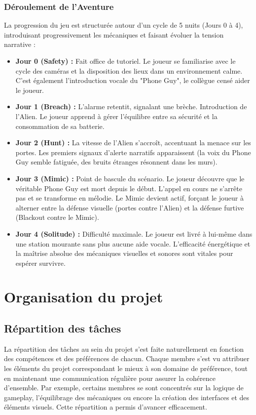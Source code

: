 \documentclass[11pt, a4paper]{article}
\begin{document}
    \subsubsection{Déroulement de l'Aventure}
    
    La progression du jeu est structurée autour d'un cycle de 5 nuits (Jours 0 à 4), introduisant progressivement les mécaniques et faisant évoluer la tension narrative :
    \begin{itemize}
        \item \textbf{Jour 0 (Safety) :} Fait office de tutoriel. Le joueur se familiarise avec le cycle des caméras et la disposition des lieux dans un environnement calme. C'est également l'introduction vocale du "Phone Guy", le collègue censé aider le joueur.
        \item \textbf{Jour 1 (Breach) :} L'alarme retentit, signalant une brèche. Introduction de l'Alien. Le joueur apprend à gérer l'équilibre entre sa sécurité et la consommation de sa batterie.
        \item \textbf{Jour 2 (Hunt) :} La vitesse de l'Alien s'accroît, accentuant la menace sur les portes. Les premiers signaux d'alerte narratifs apparaissent (la voix du Phone Guy semble fatiguée, des bruits étranges résonnent dans les murs).
        \item \textbf{Jour 3 (Mimic) :} Point de bascule du scénario. Le joueur découvre que le véritable Phone Guy est mort depuis le début. L'appel en cours ne s'arrête pas et se transforme en mélodie. Le Mimic devient actif, forçant le joueur à alterner entre la défense visuelle (portes contre l'Alien) et la défense furtive (Blackout contre le Mimic).
        \item \textbf{Jour 4 (Solitude) :} Difficulté maximale. Le joueur est livré à lui-même dans une station mourante sans plus aucune aide vocale. L'efficacité énergétique et la maîtrise absolue des mécaniques visuelles et sonores sont vitales pour espérer survivre.
    \end{itemize}

\section{Organisation du projet}
    \subsection{Répartition des tâches}
        
        La répartition des tâches au sein du projet s’est faite naturellement en fonction des compétences et des préférences de chacun. Chaque membre s’est vu attribuer les éléments du projet correspondant le mieux à son domaine de préférence, tout en maintenant une communication régulière pour assurer la cohérence d’ensemble. Par exemple, certains membres se sont concentrés sur la logique de gameplay, l’équilibrage des mécaniques ou encore la création des interfaces et des éléments visuels. Cette répartition a permis d’avancer efficacement.\\
        
\end{document}
